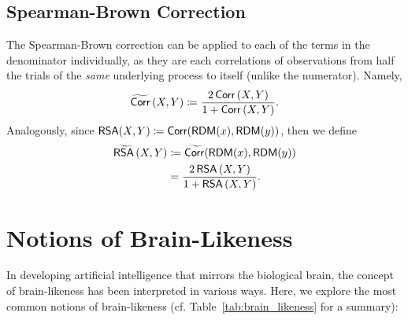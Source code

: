 \subsection{Spearman-Brown Correction}
\label{ss:methods-interanimal-spearman-brown}
The Spearman-Brown correction can be applied to each of the terms in the denominator individually, as they are each correlations of observations from half the trials of the \emph{same} underlying process to itself (unlike the numerator). Namely,
\begin{equation*}
\widetilde{\operatorname{\mathsf{Corr}}}\left(X,Y\right) \coloneqq \frac{2\operatorname{\mathsf{Corr}}\left(X,Y\right)}{1 + \operatorname{\mathsf{Corr}}\left(X,Y\right)}.
\end{equation*}
Analogously, since $\operatorname{\mathsf{RSA}}(X,Y) \coloneqq \operatorname{\mathsf{Corr}}(\operatorname{\mathsf{RDM}}(x), \operatorname{\mathsf{RDM}}(y))$, then we define
\begin{align*}
\widetilde{\operatorname{\mathsf{RSA}}}\left(X,Y\right) &\coloneqq \widetilde{\operatorname{\mathsf{Corr}}}(\operatorname{\mathsf{RDM}}(x), \operatorname{\mathsf{RDM}}(y)) \\
    &= \frac{2\operatorname{\mathsf{RSA}}\left(X,Y\right)}{1 + \operatorname{\mathsf{RSA}}\left(X,Y\right)}.
\end{align*}

\section{Notions of Brain-Likeness}
\label{sec:notions}
In developing artificial intelligence that mirrors the biological brain, the concept of brain-likeness has been interpreted in various ways. Here, we explore the most common notions of brain-likeness (cf. Table~\ref{tab:brain_likeness} for a summary):

